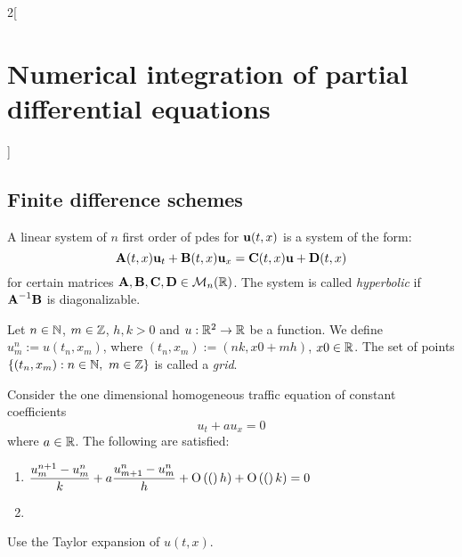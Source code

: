 \documentclass[../../../main_math.tex]{subfiles}
\begin{document}
\begin{multicols}{2}[\section{Numerical integration of partial differential equations}]
  \subsection{Finite difference schemes}
  \begin{definition}
    A linear system of $n$ first order of pdes for $\boldsymbol{\mathrm{u}}(t,x)$ is a system of the form: $$\boldsymbol{\mathrm{A}}(t,x)\boldsymbol{\mathrm{u}}_t+\boldsymbol{\mathrm{B}}(t,x)\boldsymbol{\mathrm{u}}_x=\boldsymbol{\mathrm{C}}(t,x)\boldsymbol{\mathrm{u}}+\boldsymbol{\mathrm{D}}(t,x)$$
    for certain matrices $\boldsymbol{\mathrm{A}},\boldsymbol{\mathrm{B}},\boldsymbol{\mathrm{C}}, \boldsymbol{\mathrm{D}}\in \mathcal{M}_n(\mathbb{R})$. The system is called \emph{hyperbolic} if $\boldsymbol{\mathrm{A}}^{-1}\boldsymbol{\mathrm{B}}$ is diagonalizable.
  \end{definition}
  \begin{definition}
    Let $n\in\mathbb{N}$, $m\in\mathbb{Z}$, $h,k>0$ and $u:\mathbb{R}^2\rightarrow\mathbb{R}$ be a function. We define $u_m^n:=u(t_n,x_m)$, where $(t_n, x_m):=(nk,x0+mh)$, $x0\in\mathbb{R}$. The set of points $\{(t_n,x_m):n\in\mathbb{N},\ m\in\mathbb{Z}\}$ is called a \emph{grid}.
  \end{definition}
  \begin{proposition}
    Consider the one dimensional homogeneous traffic equation of constant coefficients $$u_t+au_x=0$$
    where $a\in\mathbb{R}$.
    The following are satisfied:
    \begin{enumerate}
      \item $\displaystyle\frac{u_m^{n+1}-u_m^n}{k}+a\frac{u_{m+1}^n-u_m^n}{h}+\mathrm{O}\left((\right)h)+\mathrm{O}\left((\right)k)=0$
      \item
    \end{enumerate}
  \end{proposition}
  \begin{sproof}
    Use the Taylor expansion of $u(t,x)$.
  \end{sproof}
\end{multicols}
\end{document}

